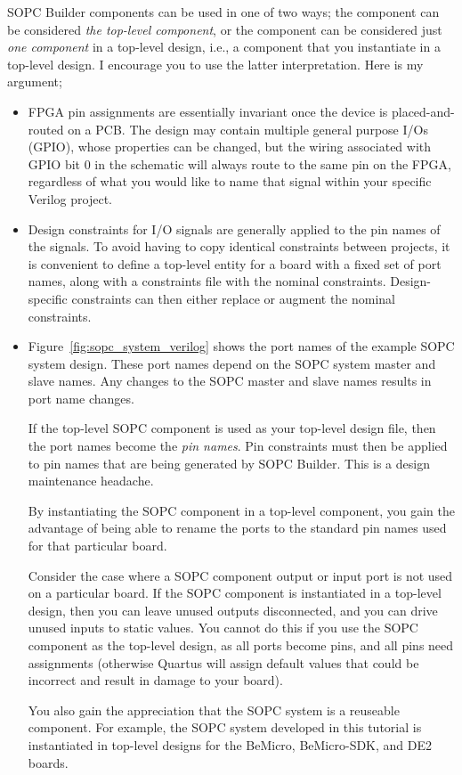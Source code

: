\documentclass[10pt,twoside]{article}
\begin{document}
SOPC Builder components can be used in one of two ways; the
component can be considered {\em the top-level component}, or 
the component can be considered just {\em one component} in a
top-level design, i.e.,  a component that you instantiate
in a top-level design. I encourage you to use the
latter interpretation. Here is my argument;
%
\begin{itemize}
%
\item FPGA pin assignments are essentially invariant once the 
device is placed-and-routed on a PCB. The design may contain
multiple general purpose I/Os (GPIO), whose properties
can be changed, but the wiring associated with GPIO bit 0
in the schematic will always route to the same pin on the FPGA, 
regardless of what you would like to name that signal within your
specific Verilog project.
%
\item Design constraints for I/O signals are generally applied
to the pin names of the signals. To avoid having to copy identical
constraints between projects, it is convenient to define a
top-level entity for a board with a fixed set of port names,
along with a constraints file with the nominal constraints.
Design-specific constraints can then either replace or augment
the nominal constraints.
%
\item Figure~\ref{fig:sopc_system_verilog} shows the port names
of the example SOPC system design. These port names depend on
the SOPC system master and slave names. Any changes to the SOPC
master and slave names results in port name changes.

If the top-level SOPC component is used as your top-level design
file, then the port names become the {\em pin names}.
Pin constraints must then be applied to pin names that are
being generated by SOPC Builder. This is a design maintenance 
headache.

By instantiating the SOPC component in a top-level component,
you gain the advantage of being able to rename the ports to
the standard pin names used for that particular board.

Consider the case where a SOPC component output or input port is
not used on a particular board. If the SOPC component is 
instantiated in a top-level design, then you can leave unused
outputs disconnected, and you can drive unused inputs to static values.
You cannot do this if you use the SOPC component as the top-level
design, as all ports become pins, and all pins need assignments
(otherwise Quartus will assign default values that could be
incorrect and result in damage to your board).

You also gain the appreciation that the SOPC system is a
reuseable component. For example, the SOPC system developed in
this tutorial is instantiated in top-level designs for the
BeMicro, BeMicro-SDK, and DE2 boards.

\end{itemize}
\end{document}
